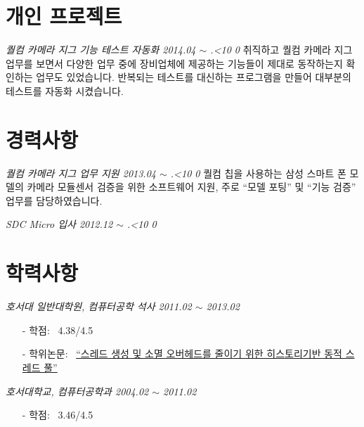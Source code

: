 \documentclass[line,margin]{res}
\renewcommand{\today}{\number\year.\ifnum\number\month<10 0\fi \number\month}
\begin{document}
\begin{resume}
  \section{개인 프로젝트}

  {\sl 퀄컴 카메라 지그 기능 테스트 자동화 \hfill 2014.04 $\sim$ \today}
  \vspace{1mm}
  \newline
  {
    \small
    취직하고 퀄컴 카메라 지그 업무를 보면서 다양한 업무 중에 장비업체에 제공하는 기능들이 제대로 동작하는지 확인하는 업무도 있었습니다.
    반복되는 테스트를 대신하는 프로그램을 만들어 대부분의 테스트를 자동화 시켰습니다.
  }


  \section{경력사항}

  {\sl 퀄컴 카메라 지그 업무 지원 \hfill 2013.04 $\sim$ \today}
  \vspace{1mm}
  \newline
  {
    \small
    퀄컴 칩을 사용하는 삼성 스마트 폰 모델의 카메라 모듈센서 검증을 위한 소프트웨어 지원,
    주로 ``모델 포팅'' 및 ``기능 검증'' 업무를 담당하였습니다.
  }

  {\sl SDC Micro 입사 \hfill 2012.12 $\sim$ \today}
  \vspace{0mm}


  \section{학력사항}

  {\sl 호서대 일반대학원, 컴퓨터공학 석사 \hfill 2011.02 $\sim$ 2013.02}
  \vspace{0mm}
  {
    \small
    \begin{itemize}
    \item[-] 학점: ~4.38/4.5 \vspace{-1mm}
    \item[-] 학위논문: ~\href{http://dlibrary.hoseo.ac.kr/search/DetailView.ax?sid=4&cid=950591}
      {``스레드 생성 및 소멸 오버헤드를 줄이기 위한 히스토리기반 동적 스레드 풀''}
    \end{itemize}
  }

  {\sl 호서대학교, 컴퓨터공학과 \hfill 2004.02 $\sim$ 2011.02}
  \vspace{0mm}
  {
    \small
    \begin{itemize}
    \item[-] 학점: ~3.46/4.5
    \end{itemize}
  }


\end{resume}

\end{document}
